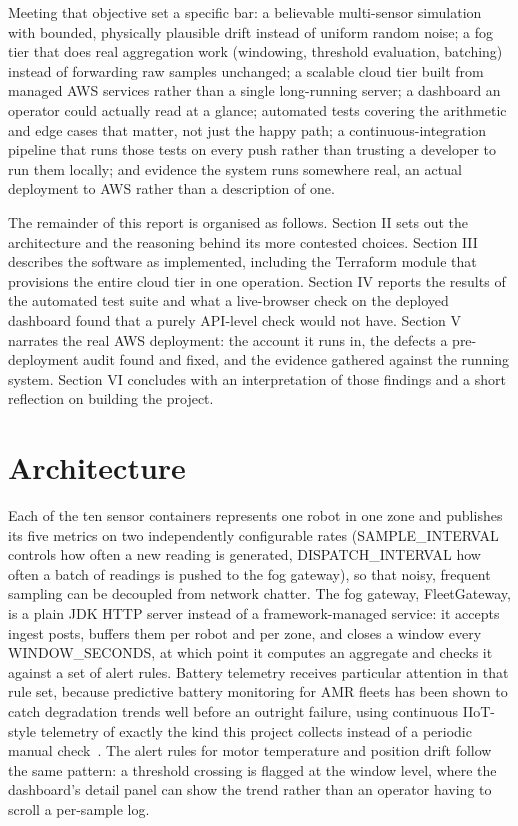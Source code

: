 \documentclass[conference]{IEEEtran}
\begin{document}
Meeting that objective set a specific bar: a believable multi-sensor simulation with bounded, physically plausible drift instead of uniform random noise; a fog tier that does real aggregation work (windowing, threshold evaluation, batching) instead of forwarding raw samples unchanged; a scalable cloud tier built from managed AWS services rather than a single long-running server; a dashboard an operator could actually read at a glance; automated tests covering the arithmetic and edge cases that matter, not just the happy path; a continuous-integration pipeline that runs those tests on every push rather than trusting a developer to run them locally; and evidence the system runs somewhere real, an actual deployment to AWS rather than a description of one.

The remainder of this report is organised as follows. Section II sets out the architecture and the reasoning behind its more contested choices. Section III describes the software as implemented, including the Terraform module that provisions the entire cloud tier in one operation. Section IV reports the results of the automated test suite and what a live-browser check on the deployed dashboard found that a purely API-level check would not have. Section V narrates the real AWS deployment: the account it runs in, the defects a pre-deployment audit found and fixed, and the evidence gathered against the running system. Section VI concludes with an interpretation of those findings and a short reflection on building the project.

\section{Architecture}

Each of the ten sensor containers represents one robot in one zone and publishes its five metrics on two independently configurable rates (SAMPLE\_INTERVAL controls how often a new reading is generated, DISPATCH\_INTERVAL how often a batch of readings is pushed to the fog gateway), so that noisy, frequent sampling can be decoupled from network chatter. The fog gateway, FleetGateway, is a plain JDK HTTP server instead of a framework-managed service: it accepts ingest posts, buffers them per robot and per zone, and closes a window every WINDOW\_SECONDS, at which point it computes an aggregate and checks it against a set of alert rules. Battery telemetry receives particular attention in that rule set, because predictive battery monitoring for AMR fleets has been shown to catch degradation trends well before an outright failure, using continuous IIoT-style telemetry of exactly the kind this project collects instead of a periodic manual check~\cite{ref5}. The alert rules for motor temperature and position drift follow the same pattern: a threshold crossing is flagged at the window level, where the dashboard's detail panel can show the trend rather than an operator having to scroll a per-sample log.
\end{document}
